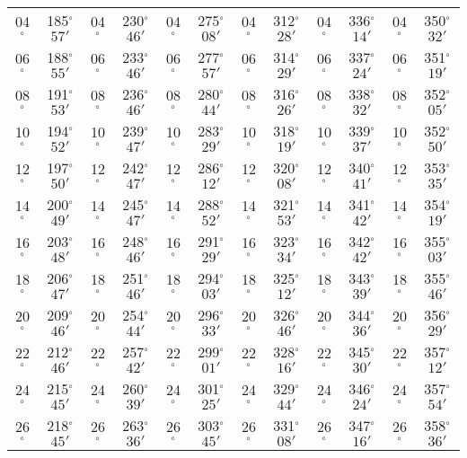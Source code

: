 \begin{table}
{\begin{tabular}{cc|cc|cc|cc|cc|cc}
04$^\circ$ & 185$^\circ$$57'$ & 04$^\circ$ & 230$^\circ$$46'$ & 04$^\circ$ & 275$^\circ$$08'$ & 04$^\circ$ & 312$^\circ$$28'$ &  04$^\circ$ & 336$^\circ$$14'$ & 04$^\circ$ & 350$^\circ$$32'$\\
06$^\circ$ & 188$^\circ$$55'$ & 06$^\circ$ & 233$^\circ$$46'$ & 06$^\circ$ & 277$^\circ$$57'$ & 06$^\circ$ & 314$^\circ$$29'$ &  06$^\circ$ & 337$^\circ$$24'$ & 06$^\circ$ & 351$^\circ$$19'$\\
08$^\circ$ & 191$^\circ$$53'$ & 08$^\circ$ & 236$^\circ$$46'$ & 08$^\circ$ & 280$^\circ$$44'$ & 08$^\circ$ & 316$^\circ$$26'$ &  08$^\circ$ & 338$^\circ$$32'$ & 08$^\circ$ & 352$^\circ$$05'$\\
10$^\circ$ & 194$^\circ$$52'$ & 10$^\circ$ & 239$^\circ$$47'$ & 10$^\circ$ & 283$^\circ$$29'$ & 10$^\circ$ & 318$^\circ$$19'$ &  10$^\circ$ & 339$^\circ$$37'$ & 10$^\circ$ & 352$^\circ$$50'$\\
12$^\circ$ & 197$^\circ$$50'$ & 12$^\circ$ & 242$^\circ$$47'$ & 12$^\circ$ & 286$^\circ$$12'$ & 12$^\circ$ & 320$^\circ$$08'$ &  12$^\circ$ & 340$^\circ$$41'$ & 12$^\circ$ & 353$^\circ$$35'$\\
14$^\circ$ & 200$^\circ$$49'$ & 14$^\circ$ & 245$^\circ$$47'$ & 14$^\circ$ & 288$^\circ$$52'$ & 14$^\circ$ & 321$^\circ$$53'$ &  14$^\circ$ & 341$^\circ$$42'$ & 14$^\circ$ & 354$^\circ$$19'$\\
16$^\circ$ & 203$^\circ$$48'$ & 16$^\circ$ & 248$^\circ$$46'$ & 16$^\circ$ & 291$^\circ$$29'$ & 16$^\circ$ & 323$^\circ$$34'$ &  16$^\circ$ & 342$^\circ$$42'$ & 16$^\circ$ & 355$^\circ$$03'$\\
18$^\circ$ & 206$^\circ$$47'$ & 18$^\circ$ & 251$^\circ$$46'$ & 18$^\circ$ & 294$^\circ$$03'$ & 18$^\circ$ & 325$^\circ$$12'$ &  18$^\circ$ & 343$^\circ$$39'$ & 18$^\circ$ & 355$^\circ$$46'$\\
20$^\circ$ & 209$^\circ$$46'$ & 20$^\circ$ & 254$^\circ$$44'$ & 20$^\circ$ & 296$^\circ$$33'$ & 20$^\circ$ & 326$^\circ$$46'$ &  20$^\circ$ & 344$^\circ$$36'$ & 20$^\circ$ & 356$^\circ$$29'$\\
22$^\circ$ & 212$^\circ$$46'$ & 22$^\circ$ & 257$^\circ$$42'$ & 22$^\circ$ & 299$^\circ$$01'$ & 22$^\circ$ & 328$^\circ$$16'$ &  22$^\circ$ & 345$^\circ$$30'$ & 22$^\circ$ & 357$^\circ$$12'$\\
24$^\circ$ & 215$^\circ$$45'$ & 24$^\circ$ & 260$^\circ$$39'$ & 24$^\circ$ & 301$^\circ$$25'$ & 24$^\circ$ & 329$^\circ$$44'$ &  24$^\circ$ & 346$^\circ$$24'$ & 24$^\circ$ & 357$^\circ$$54'$\\
26$^\circ$ & 218$^\circ$$45'$ & 26$^\circ$ & 263$^\circ$$36'$ & 26$^\circ$ & 303$^\circ$$45'$ & 26$^\circ$ & 331$^\circ$$08'$ &  26$^\circ$ & 347$^\circ$$16'$ & 26$^\circ$ & 358$^\circ$$36'$\\

\end{tabular}}
\end{table}
